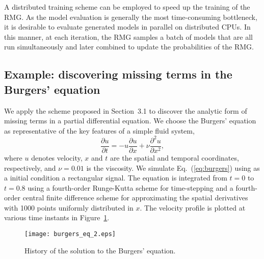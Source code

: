 \documentclass{article}
\begin{document}
A distributed training scheme can be employed to speed up the training
of the RMG. As the model evaluation is generally the most
time-consuming bottleneck, it is desirable to evaluate generated
models in parallel on distributed CPUs. In this manner, at each
iteration, the RMG samples a batch of models that are all run
simultaneously and later combined to update the probabilities of the
RMG.



\subsection{Example: discovering missing terms in the Burgers' equation}


We apply the scheme proposed in Section~3.1 to discover the analytic form
of missing terms in a partial differential equation. We choose the
Burgers' equation as representative of the key features of a simple
fluid system,
\begin{equation}\label{eq:burgers}
\frac{\partial u}{\partial t} = -u\frac{\partial u}{\partial x} + \nu \frac{\partial^2 u}{ \partial x^2},
\end{equation}
where $u$ denotes velocity, $x$ and $t$ are the spatial and temporal
coordinates, respectively, and $\nu=0.01$ is the viscosity. We
simulate Eq.~(\ref{eq:burgers}) using as a initial condition a
rectangular signal. The equation is integrated from $t=0$ to $t=0.8$
using a fourth-order Runge-Kutta scheme for time-stepping and a
fourth-order central finite difference scheme for approximating the
spatial derivatives with 1000 points uniformly distributed in $x$. The
velocity profile is plotted at various time instants in
Figure~\ref{fig:burgers}.
\begin{figure}
    \centering
    \vspace{10px}
    \texttt{[image: burgers\_eq\_2.eps]}
    \caption{History of the solution to the Burgers' equation. \label{fig:burgers}}
\end{figure}
\end{document}
